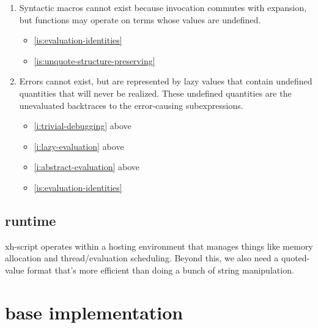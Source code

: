 \documentclass{report}
\makeatletter
\newcommand*{\Label}[2]{%
  \@bsphack
  \begingroup
    \label{#1-original}%
    \def\@currentlabel{#2 [\ref{#1-original}]}%
    \label{#1}%
  \endgroup
  \@esphack
}
\makeatother
\begin{document}
\begin{enumerate}
\item{}\Label{is:macros-cannot-exist}{nomacros}
  Syntactic macros cannot exist because invocation commutes with expansion,
  but functions may operate on terms whose values are undefined.
\begin{itemize}
\item \ref{is:evaluation-identities}
\item \ref{is:unquote-structure-preserving}
\end{itemize}
\item{}\Label{is:errors-cannot-exist}{noerrors}
  Errors cannot exist, but are represented by lazy values that contain
  undefined quantities that will never be realized. These undefined
  quantities are the unevaluated backtraces to the error-causing
  subexpressions.
\begin{itemize}
\item \ref{i:trivial-debugging} above
\item \ref{i:lazy-evaluation} above
\item \ref{i:abstract-evaluation} above
\item \ref{is:evaluation-identities}
\end{itemize}
\end{enumerate}

\chapter{runtime}\label{chp:runtime}
  xh-script operates within a hosting environment that manages things like
  memory allocation and thread/evaluation scheduling. Beyond this, we also need
  a quoted-value format that's more efficient than doing a bunch of string
  manipulation.

\part{base implementation}\label{part:base-implementation}
\end{document}
